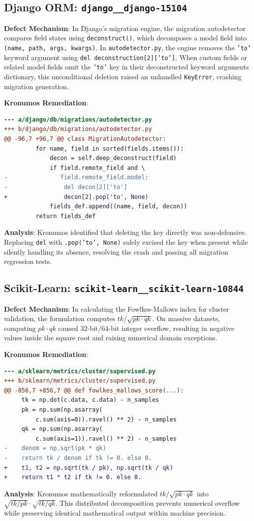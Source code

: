 \documentclass[10pt,twocolumn,letterpaper]{article}
\begin{document}
\subsection{Django ORM: \texttt{django\_\_django-15104}}
\textbf{Defect Mechanism}: In Django's migration engine, the migration autodetector compares field states using \texttt{deconstruct()}, which decomposes a model field into \texttt{(name, path, args, kwargs)}. In \texttt{autodetector.py}, the engine removes the \texttt{'to'} keyword argument using \texttt{del deconstruction[2]['to']}. When custom fields or related model fields omit the \texttt{'to'} key in their deconstructed keyword arguments dictionary, this unconditional deletion raised an unhandled \texttt{KeyError}, crashing migration generation.

\textbf{Kronumos Remediation}:
\begin{lstlisting}[language=diff]
--- a/django/db/migrations/autodetector.py
+++ b/django/db/migrations/autodetector.py
@@ -96,7 +96,7 @@ class MigrationAutodetector:
         for name, field in sorted(fields.items()):
             decon = self.deep_deconstruct(field)
             if field.remote_field and \
-               field.remote_field.model:
-                del decon[2]['to']
+                decon[2].pop('to', None)
             fields_def.append((name, field, decon))
         return fields_def
\end{lstlisting}
\textbf{Analysis}: Kronumos identified that deleting the key directly was non-defensive. Replacing \texttt{del} with \texttt{.pop('to', None)} safely excised the key when present while silently handling its absence, resolving the crash and passing all migration regression tests.

\subsection{Scikit-Learn: \texttt{scikit-learn\_\_scikit-learn-10844}}
\textbf{Defect Mechanism}: In calculating the Fowlkes-Mallows index for cluster validation, the formulation computes $tk / \sqrt{pk \cdot qk}$. On massive datasets, computing $pk \cdot qk$ caused 32-bit/64-bit integer overflow, resulting in negative values inside the square root and raising numerical domain exceptions.

\textbf{Kronumos Remediation}:
\begin{lstlisting}[language=diff]
--- a/sklearn/metrics/cluster/supervised.py
+++ b/sklearn/metrics/cluster/supervised.py
@@ -856,7 +856,7 @@ def fowlkes_mallows_score(...):
     tk = np.dot(c.data, c.data) - n_samples
     pk = np.sum(np.asarray(
         c.sum(axis=0)).ravel() ** 2) - n_samples
     qk = np.sum(np.asarray(
         c.sum(axis=1)).ravel() ** 2) - n_samples
-    denom = np.sqrt(pk * qk)
-    return tk / denom if tk != 0. else 0.
+    t1, t2 = np.sqrt(tk / pk), np.sqrt(tk / qk)
+    return t1 * t2 if tk != 0. else 0.
\end{lstlisting}
\textbf{Analysis}: Kronumos mathematically reformulated $tk / \sqrt{pk \cdot qk}$ into $\sqrt{tk / pk} \cdot \sqrt{tk / qk}$. This distributed decomposition prevents numerical overflow while preserving identical mathematical output within machine precision.
\end{document}
